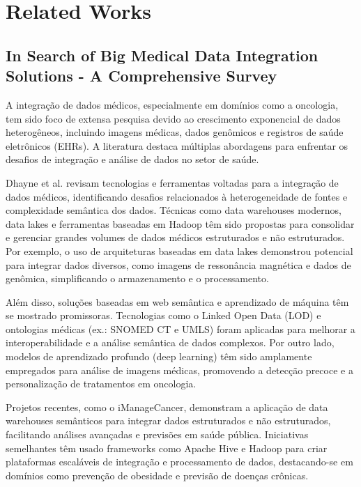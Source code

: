
\chapter[Related Works]{Related Works}


\section{In Search of Big Medical Data Integration Solutions - A Comprehensive Survey}

A integração de dados médicos, especialmente em domínios como a oncologia, tem sido foco de extensa pesquisa devido ao crescimento 
exponencial de dados heterogêneos, incluindo imagens médicas, dados genômicos e registros de saúde eletrônicos (EHRs). A literatura 
destaca múltiplas abordagens para enfrentar os desafios de integração e análise de dados no setor de saúde. \cite{dhayne2019}

Dhayne et al. \cite{dhayne2019} revisam tecnologias e ferramentas voltadas para a integração de dados médicos, identificando desafios relacionados à 
heterogeneidade de fontes e complexidade semântica dos dados. Técnicas como data warehouses modernos, data lakes e ferramentas baseadas 
em Hadoop têm sido propostas para consolidar e gerenciar grandes volumes de dados médicos estruturados e não estruturados. Por exemplo, 
o uso de arquiteturas baseadas em data lakes demonstrou potencial para integrar dados diversos, como imagens de ressonância magnética e 
dados de genômica, simplificando o armazenamento e o processamento.

Além disso, soluções baseadas em web semântica e aprendizado de máquina têm se mostrado promissoras. Tecnologias como o Linked Open Data (LOD) 
e ontologias médicas (ex.: SNOMED CT e UMLS) foram aplicadas para melhorar a interoperabilidade e a análise semântica de dados complexos. 
Por outro lado, modelos de aprendizado profundo (deep learning) têm sido amplamente empregados para análise de imagens médicas, promovendo 
a detecção precoce e a personalização de tratamentos em oncologia. \cite{dhayne2019}

Projetos recentes, como o iManageCancer, demonstram a aplicação de data warehouses semânticos para integrar dados estruturados e não estruturados, 
facilitando análises avançadas e previsões em saúde pública. Iniciativas semelhantes têm usado frameworks como Apache Hive e Hadoop para criar 
plataformas escaláveis de integração e processamento de dados, destacando-se em domínios como prevenção de obesidade e previsão de doenças crônicas. \cite{dhayne2019}


